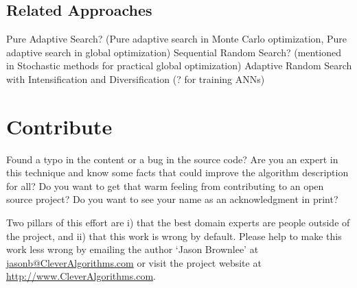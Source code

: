 \documentclass[a4paper, 11pt]{article}
\makeatletter
\newcommand{\myreportauthor}{Jason Brownlee}
\newcommand{\myreportemail}{jasonb@CleverAlgorithms.com}
\newcommand{\myreportwebsite}{http://www.CleverAlgorithms.com}
\makeatother
\begin{document}
\subsection{Related Approaches}
Pure Adaptive Search? (Pure adaptive search in Monte Carlo optimization, Pure adaptive search in global optimization)
Sequential Random Search? (mentioned in Stochastic methods for practical global optimization)
Adaptive Random Search with Intensification and Diversification (? for training ANNs)


% 
% 
\section{Contribute}
\label{sec:contribute}
Found a typo in the content or a bug in the source code? 
Are you an expert in this technique and know some facts that could improve the algorithm description for all?
Do you want to get that warm feeling from contributing to an open source project? 
Do you want to see your name as an acknowledgment in print?

Two pillars of this effort are i) that the best domain experts are people outside of the project, and ii) that this work is wrong by default. 
Please help to make this work less wrong by emailing the author `\myreportauthor' at \url{\myreportemail} or visit the project website at \url{\myreportwebsite}.



\end{document}

